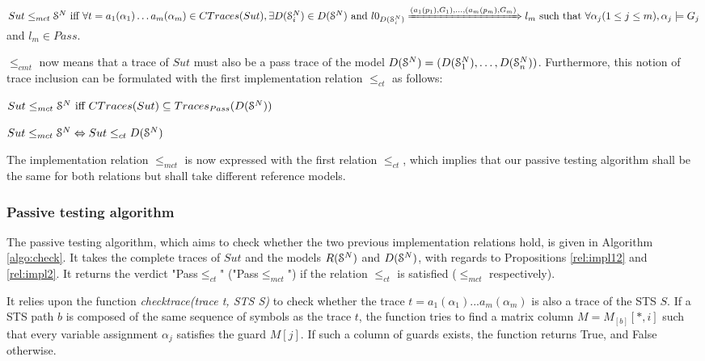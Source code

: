\begin{proposition}
    ${Sut} \leq_{mct} \EuScript{S}^{N} \text{ iff }\forall t=
    a_1(\alpha_1) \dots a_m(\alpha_m) \in CTraces({Sut}), \exists D(\EuScript{S}_i^{N}) \in D(\EuScript{S}^{N}) \text{ and }
    l0_{D(\EuScript{S}_i^{N})}
    \xRightarrow{(a_1(p_1),G_{1}),\dots,(a_m(p_m),G_{m})} l_m \text{
    such that } \forall \alpha_j (1 \leq j \leq m), \alpha_j \models G_{j}$ and $l_m \in Pass$.
\end{proposition}


$\leq_{cmt}$ now means that a trace of $\mathit{Sut}$ must also
be a pass trace of the model
$D(\EuScript{S}^{N})=(D(\EuScript{S}_1^{N}),\dots,D(\EuScript{S}_n^{N}))$.
Furthermore, this notion of trace inclusion can be formulated
with the first implementation relation $\leq_{ct}$ as follows:

\begin{proposition}
	\label{rel:impl2}
${Sut} \leq_{mct} \EuScript{S}^{N} \text{ iff } CTraces({Sut})\subseteq Traces_{Pass}(D(\EuScript{S}^{N}))$

${Sut} \leq_{mct} \EuScript{S}^{N}\Leftrightarrow {Sut} \leq_{ct} D(\EuScript{S}^{N})$

\end{proposition}

The implementation relation $\leq_{mct}$ is now expressed with the first
relation $\leq_{ct}$, which implies that our passive testing algorithm shall be
the same for both relations but shall take different reference models.

\subsubsection{Passive testing algorithm}

The passive testing algorithm, which aims to check whether the
two previous implementation relations hold, is given in Algorithm
\ref{algo:check}. It takes the complete traces of $\mathit{Sut}$ and the
models $R(\EuScript{S}^{N})$ and $D(\EuScript{S}^{N})$, with
regards to Propositions \ref{rel:impl12} and \ref{rel:impl2}. It
returns the verdict "Pass$\leq_{ct}$" ("Pass$\leq_{mct}$") if the
relation $\leq_{ct}$ is satisfied ($\leq_{mct}$ respectively).

It relies upon the function \textit{checktrace(trace t, STS S)} to check
whether the trace $t=a_1(\alpha_1)...a_m(\alpha_m)$ is also a
trace of the STS $S$. If a STS path $b$ is composed of the same sequence of
symbols as the trace $t$, the function tries to find a matrix
column  $M=M_{[b]}[*,i]$ such that every variable assignment $\alpha_j$
satisfies the guard $M[j]$. If such a column of guards exists,
the function returns True, and False otherwise.

